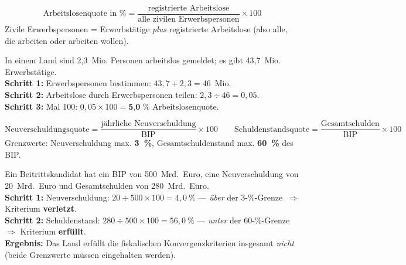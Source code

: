 \documentclass[11pt, a4paper]{article}
\begin{document}
\begin{merksatz}[title={\bfseries Formel 3: Arbeitslosenquote}]
\[
\text{Arbeitslosenquote in \%} =
\frac{\text{registrierte Arbeitslose}}{\text{alle zivilen Erwerbspersonen}} \times 100
\]
Zivile Erwerbspersonen = Erwerbstätige \emph{plus} registrierte Arbeitslose (also alle,
die arbeiten oder arbeiten wollen).
\end{merksatz}

\begin{beispiel}
In einem Land sind 2,3~Mio. Personen arbeitslos gemeldet; es gibt 43,7~Mio. Erwerbstätige.\\[0.3em]
\textbf{Schritt 1:} Erwerbspersonen bestimmen: $43{,}7 + 2{,}3 = 46$~Mio.\\
\textbf{Schritt 2:} Arbeitslose durch Erwerbspersonen teilen: $2{,}3 \div 46 = 0{,}05$.\\
\textbf{Schritt 3:} Mal 100: $0{,}05 \times 100 = \textbf{5{,}0~\%}$ Arbeitslosenquote.
\end{beispiel}

\begin{merksatz}[title={\bfseries Anwendung: Konvergenzkriterien nachrechnen (3~\% / 60~\%)}]
\[
\text{Neuverschuldungsquote} = \frac{\text{jährliche Neuverschuldung}}{\text{BIP}} \times 100
\qquad
\text{Schuldenstandsquote} = \frac{\text{Gesamtschulden}}{\text{BIP}} \times 100
\]
Grenzwerte: Neuverschuldung max. \textbf{3~\%}, Gesamtschuldenstand max. \textbf{60~\%}
des BIP.
\end{merksatz}

\begin{beispiel}
Ein Beitrittskandidat hat ein BIP von 500~Mrd.~Euro, eine Neuverschuldung von
20~Mrd.~Euro und Gesamtschulden von 280~Mrd.~Euro.\\[0.3em]
\textbf{Schritt 1:} Neuverschuldung: $20 \div 500 \times 100 = 4{,}0~\%$ ---
\emph{über} der 3-\%-Grenze~$\Rightarrow$ Kriterium \textbf{verletzt}.\\
\textbf{Schritt 2:} Schuldenstand: $280 \div 500 \times 100 = 56{,}0~\%$ ---
\emph{unter} der 60-\%-Grenze~$\Rightarrow$ Kriterium \textbf{erfüllt}.\\
\textbf{Ergebnis:} Das Land erfüllt die fiskalischen Konvergenzkriterien insgesamt
\emph{nicht} (beide Grenzwerte müssen eingehalten werden).
\end{beispiel}
\end{document}
